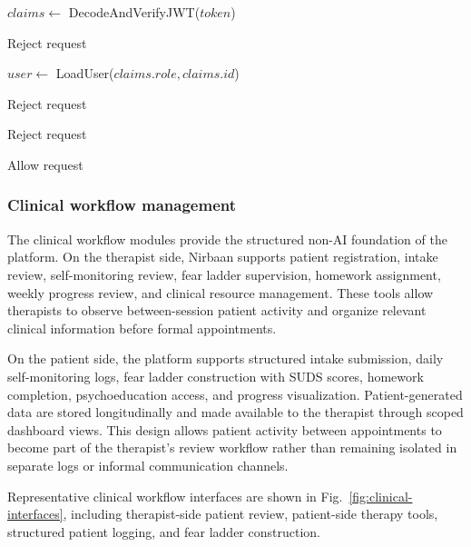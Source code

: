 \documentclass[preprint,12pt,a4paper]{elsarticle}
\begin{document}
\begin{algorithm}[H]
\caption{Role-based authorization workflow}
\label{alg:authorization}
\small
\begin{algorithmic}[1]

\State $claims \gets$ DecodeAndVerifyJWT($token$)

    \State Reject request
\EndIf

\State $user \gets$ LoadUser($claims.role, claims.id$)

    \State Reject request
\EndIf

        \State Reject request
    \EndIf
\EndIf

\State Allow request

\EndProcedure
\end{algorithmic}
\end{algorithm}

\subsubsection{Clinical workflow management}

The clinical workflow modules provide the structured non-AI foundation of the platform. On the therapist side, Nirbaan supports patient registration, intake review, self-monitoring review, fear ladder supervision, homework assignment, weekly progress review, and clinical resource management. These tools allow therapists to observe between-session patient activity and organize relevant clinical information before formal appointments.

On the patient side, the platform supports structured intake submission, daily self-monitoring logs, fear ladder construction with SUDS scores, homework completion, psychoeducation access, and progress visualization. Patient-generated data are stored longitudinally and made available to the therapist through scoped dashboard views. This design allows patient activity between appointments to become part of the therapist's review workflow rather than remaining isolated in separate logs or informal communication channels.

Representative clinical workflow interfaces are shown in Fig.~\ref{fig:clinical-interfaces}, including therapist-side patient review, patient-side therapy tools, structured patient logging, and fear ladder construction.
\end{document}
